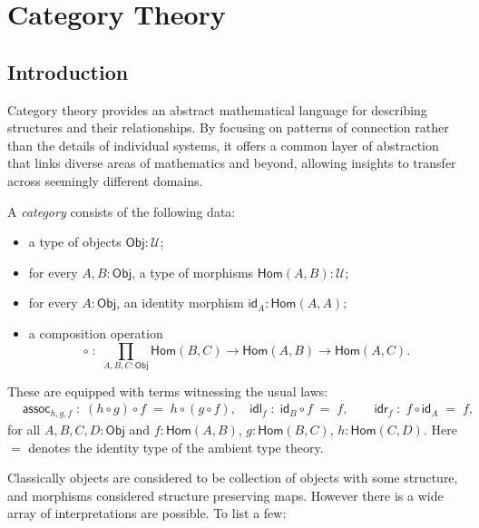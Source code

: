 \section{Category Theory}
\subsection{Introduction}
Category theory provides an abstract mathematical language for describing structures and their relationships. By focusing on patterns of connection rather than the details of individual systems, it offers a common layer of abstraction that links diverse areas of mathematics and beyond, allowing insights to transfer across seemingly different domains.
\begin{definition}
	A \emph{category} consists of the following data:
	\begin{itemize}
		\item a type of objects $\mathsf{Obj} : \mathcal{U}$;
		\item for every $A,B:\mathsf{Obj}$, a type of morphisms
		      $\mathsf{Hom}(A,B) : \mathcal{U}$;
		\item for every $A:\mathsf{Obj}$, an identity morphism
		      $\mathsf{id}_A : \mathsf{Hom}(A,A)$;
		\item a composition operation
		      \[
			      \circ \;:\; \prod_{A,B,C:\mathsf{Obj}}
			      \mathsf{Hom}(B,C) \to \mathsf{Hom}(A,B) \to \mathsf{Hom}(A,C).
		      \]
	\end{itemize}
	These are equipped with terms witnessing the usual laws:
	$$
		\begin{aligned}
			 & \mathsf{assoc}_{h,g,f} \;:\;
			(h \circ g) \circ f \;=\; h \circ (g \circ f),                  \
			 & \mathsf{idl}_{f} \;:\; \mathsf{id}_B \circ f \;=\; f, \qquad
			\mathsf{idr}_{f} \;:\; f \circ \mathsf{id}_A \;=\; f,
		\end{aligned}
	$$
	for all $A,B,C,D:\mathsf{Obj}$ and
	$f:\mathsf{Hom}(A,B)$, $g:\mathsf{Hom}(B,C)$, $h:\mathsf{Hom}(C,D)$.
	Here $=$ denotes the identity type of the ambient type theory.
\end{definition}
Classically objects are considered to be collection of objects with some structure, and morphisms considered structure preserving maps. However there is a wide array of interpretations are possible. To list a few:
